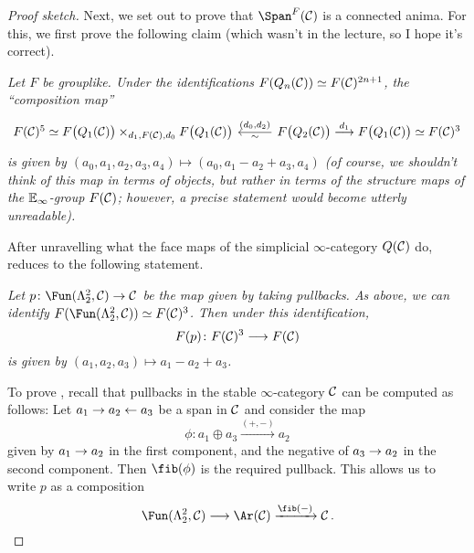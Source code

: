 \documentclass[a4paper, 10pt, oneside, DIV=9, chapterprefix=true, numbers=enddot,bibliography=totoc]{scrbook}
\newcommand{\embrace}[1]{\textup{(}#1\textup{)}}
\begin{document}
\begin{proof}[Proof sketch]
	Next, we set out to prove that $\Span^F(\Cc)$ is a connected anima. For this, we first prove the following claim (which wasn't in the lecture, so I hope it's correct).
	\begin{alphanumerate}
		\item[\itememph{\boxtimes}] \itshape Let $F$ be grouplike. Under the identifications $F(Q_n(\mathcal{C}))\simeq F(\mathcal{C})^{2n+1}$, the \enquote{composition map}
		\begin{equation*}
			\begin{tikzcd}[column sep=2.7em]
				F(\Cc)^5\simeq F\big(Q_1(\Cc)\big)\times_{d_1,F(\Cc),d_0}F\big(Q_1(\Cc)\big) & F\big(Q_2(\Cc)\big)\morphism[d_1]F\big(Q_1(\Cc)\big)\simeq F(\Cc)^3\lar["{(d_0,d_2)}"',"\sim"]
			\end{tikzcd}
		\end{equation*}
		is given by $(a_0,a_1,a_2,a_3,a_4)\mapsto (a_0,a_1-a_2+a_3,a_4)$ \embrace{of course, we shouldn't think of this map in terms of objects, but rather in terms of the structure maps of the $\mathbb{E}_\infty$-group $F(\mathcal{C})$; however, a precise statement would become utterly unreadable}.
	\end{alphanumerate}
	After unravelling what the face maps of the simplicial $\infty$-category $Q(\mathcal{C})$ do, \itememph{\boxtimes} reduces to the following statement.
	\begin{alphanumerate}
		\item[\itememph{\boxtimes'}] \itshape Let $p\colon \Fun(\Lambda_2^2,\Cc)\morphism \Cc$ be the map given by taking pullbacks. As above, we can identify $F(\Fun(\Lambda_2^2,\Cc))\simeq F(\Cc)^3$. Then under this identification,
		\begin{equation*}
			F(p)\colon F(\Cc)^3\morphism F(\Cc)
		\end{equation*}
		is given by $(a_1,a_2,a_3)\mapsto a_1-a_2+a_3$.
	\end{alphanumerate}
	To prove , recall that pullbacks in the stable $\infty$-category $\mathcal{C}$ can be computed as follows: Let $a_1\morphism a_2\lmorphism a_3$ be a span in $\mathcal{C}$ and consider the map
	\begin{equation*}
		\phi\colon a_1\oplus a_3\xrightarrow{(+,-)} a_2
	\end{equation*}
	given by $a_1\morphism a_2$ in the first component, and the negative of $a_3\morphism a_2$ in the second component. Then $\fib(\phi)$ is the required pullback. This allows us to write $p$ as a composition
	\begin{equation*}
		\Fun(\Lambda_2^2,\Cc)\morphism \Ar(\Cc)\xrightarrow{\fib(-)} \Cc\,.

\end{equation*}
\end{proof}
\end{document}
